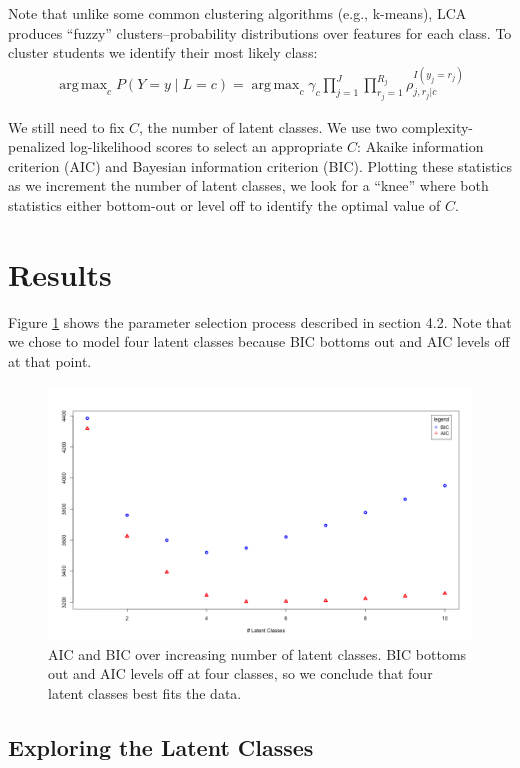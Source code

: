 \documentclass{edm_template}
\DeclareMathOperator*{\argmax}{arg\,max}
\begin{document}
Note that unlike some common clustering algorithms (e.g., k-means), LCA produces ``fuzzy'' clusters--probability distributions over features for each class. To cluster students we  identify their most likely class:
\begin{align}
\argmax_{c} P(Y = y \;|\; L = c) = \argmax_{c} \gamma_{c} \prod_{j=1}^{J} \prod_{r_{j}=1}^{R_{j}} \rho_{j,r_{j}|c}^{I(y_{j} = r_{j})}
\label{eqn:LCA-argmax}
\end{align}

We still need to fix $C$, the number of latent classes. We use two complexity-penalized log-likelihood scores to select an appropriate $C$: Akaike information criterion (AIC) and Bayesian information criterion (BIC). Plotting these statistics as we increment the number of latent classes, we look for a ``knee'' where both statistics either bottom-out or level off to identify the optimal value of $C$.

\section{Results}
\label{sec:results}

Figure \ref{fig:lca-test-statistics} shows the parameter selection process described in section 4.2. Note that we chose to model four latent classes because BIC bottoms out and AIC levels off at that point.

\begin{figure}[htbp]
\includegraphics[scale=0.25]{lca-stats-plot.png}
\caption{AIC and BIC over increasing number of latent classes. BIC bottoms out and AIC levels off at four classes, so we conclude that four latent classes best fits the data.}
\label{fig:lca-test-statistics}
\end{figure}
\subsection{Exploring the Latent Classes}
\end{document}
